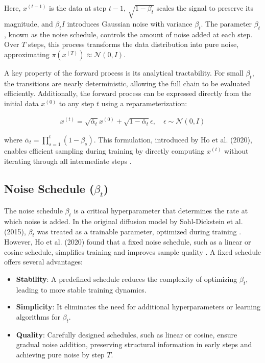 \documentclass[12pt]{article}
\begin{document}
Here, \( x^{(t-1)} \) is the data at step \( t-1 \), \( \sqrt{1 - \beta_t} \) scales the signal to preserve its magnitude, and \( \beta_t I \) introduces Gaussian noise with variance \( \beta_t \). The parameter \( \beta_t \), known as the noise schedule, controls the amount of noise added at each step. Over \( T \) steps, this process transforms the data distribution into pure noise, approximating \( \pi(x^{(T)}) \approx \mathcal{N}(0, I) \).

A key property of the forward process is its analytical tractability. For small \( \beta_t \), the transitions are nearly deterministic, allowing the full chain to be evaluated efficiently. Additionally, the forward process can be expressed directly from the initial data \( x^{(0)} \) to any step \( t \) using a reparameterization:

\begin{align}
x^{(t)} = \sqrt{\bar{\alpha}_t} x^{(0)} + \sqrt{1 - \bar{\alpha}_t} \epsilon, \quad \epsilon \sim \mathcal{N}(0, I)
\end{align}

where \( \bar{\alpha}_t = \prod_{s=1}^{t} (1 - \beta_s) \). This formulation, introduced by Ho et al. (2020), enables efficient sampling during training by directly computing \( x^{(t)} \) without iterating through all intermediate steps \cite{ho2020}.

\subsection{Noise Schedule (\(\beta_t\))}
\label{subsec:noise_schedule}

The noise schedule \( \beta_t \) is a critical hyperparameter that determines the rate at which noise is added. In the original diffusion model by Sohl-Dickstein et al. (2015), \( \beta_t \) was treated as a trainable parameter, optimized during training \cite{sohl2015}. However, Ho et al. (2020) found that a fixed noise schedule, such as a linear or cosine schedule, simplifies training and improves sample quality \cite{ho2020}. A fixed schedule offers several advantages:

\begin{itemize}
    \item \textbf{Stability}: A predefined schedule reduces the complexity of optimizing \( \beta_t \), leading to more stable training dynamics.
    \item \textbf{Simplicity}: It eliminates the need for additional hyperparameters or learning algorithms for \( \beta_t \).
    \item \textbf{Quality}: Carefully designed schedules, such as linear or cosine, ensure gradual noise addition, preserving structural information in early steps and achieving pure noise by step \( T \).
\end{itemize}
\end{document}
